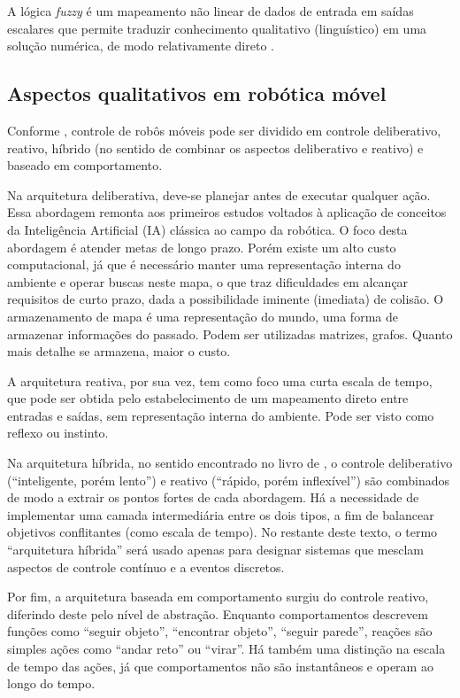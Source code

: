 A lógica \textit{fuzzy} é um mapeamento não linear de dados de entrada em saídas
escalares que permite traduzir conhecimento qualitativo (linguístico) em uma
solução numérica, de modo relativamente direto \cite{Art_Mendel}. 

\subsection{Aspectos qualitativos em robótica móvel \label{SEC:SUBSUNCAO}}

Conforme , controle de robôs móveis pode ser
dividido em controle deliberativo, reativo, híbrido (no sentido de
combinar os aspectos deliberativo e reativo) e baseado em comportamento.

Na arquitetura deliberativa, deve-se planejar antes de executar qualquer
ação. Essa abordagem remonta aos primeiros estudos voltados à aplicação de
conceitos da Inteligência Artificial (IA) clássica ao campo da robótica. O foco
desta abordagem é atender metas de longo prazo. Porém existe um alto custo 
computacional, já que é necessário manter uma representação interna do ambiente 
e operar buscas neste mapa, o que traz dificuldades em alcançar requisitos de curto 
prazo, dada a possibilidade iminente (imediata) de colisão. O armazenamento de mapa
é uma representação do mundo, uma forma de armazenar informações do passado. Podem ser
utilizadas matrizes, grafos. Quanto mais detalhe se armazena, maior o custo.

A arquitetura reativa, por sua vez, tem como foco uma curta escala de tempo, que
pode ser obtida pelo estabelecimento de um mapeamento direto entre entradas e
saídas, sem representação interna do ambiente. Pode ser visto como reflexo ou
instinto. 

Na arquitetura híbrida, no sentido encontrado no livro de
, o controle deliberativo (``inteligente, porém
lento'') e reativo (``rápido, porém inflexível'') são combinados de modo a
extrair os pontos fortes de cada abordagem. Há a necessidade de implementar uma
camada intermediária entre os dois tipos, a fim de balancear objetivos
conflitantes (como escala de tempo). No restante deste texto, o termo
``arquitetura híbrida'' será usado apenas para designar sistemas que mesclam
aspectos de controle contínuo e a eventos discretos.  

Por fim, a arquitetura baseada em comportamento surgiu do controle reativo, diferindo
deste pelo nível de abstração. Enquanto comportamentos descrevem funções como
``seguir objeto'', ``encontrar objeto'', ``seguir parede'', reações são simples
ações como ``andar reto'' ou ``virar''. Há também uma distinção na escala de
tempo das ações, já que comportamentos não são instantâneos e operam ao longo do
tempo. 

